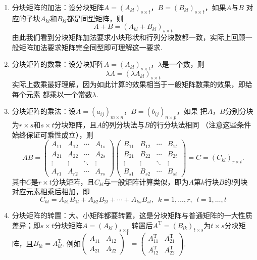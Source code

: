 \begin{enumerate}
    \item 分块矩阵的加法：设分块矩阵$A=(A_{kl})_{s \times t}$，$B=(B_{kl})_{s \times t}$，如果$A$与$B$
    对应的子块$A_{kl}$和$B_{kl}$都是同型矩阵，则\[A+B=(A_{kl}+B_{kl})_{s \times t}\]
    由此我们看到分块矩阵加法要求小块形状和行列分块数都一致，实际上回顾一般矩阵加法要求矩阵完全同型即可理解这一要求.

    \item 分块矩阵的数乘：设分块矩阵$A=(A_{kl})_{s \times t}$，$\lambda$是一个数，则
    \[\lambda A=(\lambda A_{kl})_{s \times t}\]
    实际上数乘最好理解，因为如此计算的效果相当于一般矩阵数乘的效果，即给每个元素
    都乘以一个常数$\lambda$.

    \item 分块矩阵的乘法：设$A=(a_{ij})_{m \times n}$，$B=(b_{ij})_{n \times p}$，如果
    把$A$，$B$分别分块为$r \times s$和$s \times t$分块矩阵，且$A$的列分块法与$B$的行分块法相同
    （注意这些条件始终保证可乘性成立），则
    $$AB=\begin{pmatrix}
        A_{11} & A_{12} & \cdots & A_{1s} \\
        A_{21} & A_{22} & \cdots & A_{2s} \\
        \vdots & \vdots & \ddots & \vdots \\
        A_{r1} & A_{r2} & \cdots & A_{rs}
    \end{pmatrix}\begin{pmatrix}
        B_{11} & B_{12} & \cdots & B_{1t} \\
        B_{21} & B_{22} & \cdots & B_{2t} \\
        \vdots & \vdots & \ddots & \vdots \\
        B_{s1} & B_{s2} & \cdots & B_{st}
    \end{pmatrix}=C=(C_{kl})_{r \times t}.$$
    其中$C$是$r \times t$分块矩阵，且$C_{kl}$与一般矩阵计算类似，即为$A$第$k$行块$B$的$l$列块对应元素相乘后相加，即
    \[C_{kl}=A_{k1}B_{1l}+A_{k2}B_{2l}+\cdots+A_{ks}B_{sl},\enspace k=1,\ldots,r,\enspace l=1,\ldots,t\]

    \item 分块矩阵的转置：大、小矩阵都要转置，这是分块矩阵与普通矩阵的一大性质差异；即$s \times t$分块矩阵$A=(A_{kl})_{s \times t}$
    转置后$A^\mathrm{T}=(B_{lk})_{t \times s}$为$t \times s$分块矩阵，且$B_{lk}=A_{kl}^\mathrm{T}$.
    例如$\begin{pmatrix}
        A_{11} & A_{12} \\ A_{21} & A_{22}
    \end{pmatrix}^\mathrm{T}=\begin{pmatrix}
        A_{11}^\mathrm{T} & A_{21}^\mathrm{T} \\ A_{12}^\mathrm{T} & A_{22}^\mathrm{T}
    \end{pmatrix}$.
\end{enumerate}

